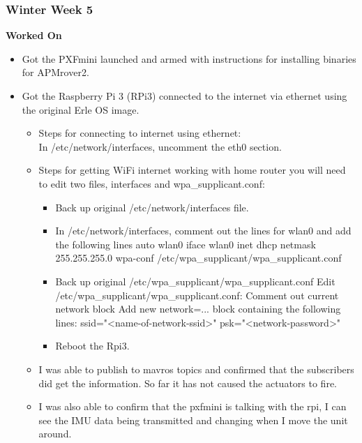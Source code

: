 \documentclass[compsoc,draftclsnofoot,onecolumn,10pt]{IEEEtran}
\begin{document}
\subsubsection*{Winter Week 5}
\textbf{Worked On}
\begin{itemize}
    \item Got the PXFmini launched and armed with instructions for installing binaries for APMrover2.
    \item Got the Raspberry Pi 3 (RPi3) connected to the internet via ethernet using the original Erle OS image.
    \begin{itemize}
        \item Steps for connecting to internet using ethernet:\\
        In /etc/network/interfaces, uncomment the eth0 section.
        \item Steps for getting WiFi internet working with home router you will need to edit two files, 
        interfaces and wpa\_supplicant.conf:
        \begin{itemize}
            \item Back up original /etc/network/interfaces file.
            \item In /etc/network/interfaces, comment out the lines for wlan0 and add the following lines
                \subitem  auto wlan0
                \subitem iface wlan0 inet dhcp
                \subitem netmask 255.255.255.0
                \subitem wpa-conf /etc/wpa\_supplicant/wpa\_supplicant.conf
            \item Back up original /etc/wpa\_supplicant/wpa\_supplicant.conf
                \subitem Edit /etc/wpa\_supplicant/wpa\_supplicant.conf:
                \subitem Comment out current network block
                \subitem Add new network={...} block containing the following lines:
                \subitem ssid="<name-of-network-ssid>"
                \subitem psk="<network-password>"
            \item Reboot the Rpi3.
        \end{itemize}
    \item I was able to publish to mavros topics and confirmed that the subscribers did get the information. So far it has not caused the actuators to fire.
    \item I was also able to confirm that the pxfmini is talking with the rpi, I can see the IMU data being transmitted and changing when I move the unit around.
    \end{itemize}
\end{itemize}
\end{document}
